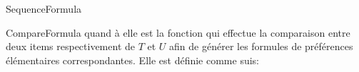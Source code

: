 \documentclass[a4paper,12pt,openany,oneside]{article}
\begin{document}
 
\begin{algorithm}[H]
 	   	
	\caption{SequenceFormula}
\end{algorithm}

CompareFormula quand à elle est la fonction qui effectue la comparaison entre deux items respectivement de $T$ et $U$ afin de générer les formules de préférences élémentaires correspondantes. Elle est définie comme suis:

	
  	 	   
\end{document}
